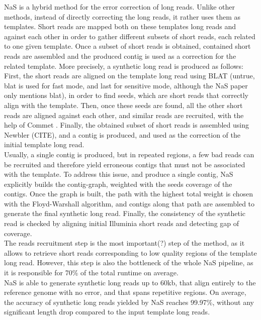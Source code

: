 \documentclass[twoside,twocolumn]{article}
\begin{document}
NaS is a hybrid method for the error correction of long reads. Unlike other methods, instead of directly correcting the long reads, it rather uses them as
templates. Short reads are mapped both on these templates long reads and against each other in order to gather different subsets of short reads, each 
related to one given template. Once a subset of short reads is obtained, contained short reads are assembled and the produced contig is used as a correction for the related template. More precisely, a synthetic long read is produced as follows: \\
\indent First, the short reads are aligned on the template long read using BLAT \cite{Kent2002} (untrue, blat is used for fast mode, and last for sensitive mode, although the NaS paper only mentions blat), in order to find seeds, which are short reads that correctly align with the template. Then, once these seeds are found, all the other short reads are aligned against each other, and similar reads are recruited,
with the help of Commet \cite{Maillet2014}. Finally, the obtained subset of short reads is assembled using Newbler (CITE), and a contig is produced,
and used as the correction of the initial template long read. \\ 
\indent Usually, a single contig is produced, but in repeated regions, a few bad reads can be recruited and therefore yield erroneous contigs 
that must not be associated with the template. To address this issue, and produce a single contig, NaS explicitly builds the contig-graph, 
weighted with the seeds coverage of the contigs. Once the graph is built, the path with the highest total weight is chosen with the Floyd-Warshall
algorithm, and contigs along that path are assembled to generate the final synthetic long read. Finally, the consistency of the synthetic read is checked
by aligning initial Illuminia short reads and detecting gap of coverage. \\
\indent The reads recruitment step is the most important(?) step of the method, as it allows to retrieve short reads corresponding to low quality
regions of the template long read. However, this step is also the bottleneck of the whole NaS pipeline, as it is responsible for 70\% of the
total runtime on average. \\
\indent NaS is able to generate synthetic long reads up to 60kb, that align entirely to the reference genome with no error, and that spans
repetitive regions. On average, the accuracy of synthetic long reads yielded by NaS reaches 99.97\%, without any significant length drop
compared to the input template long reads.
\end{document}
